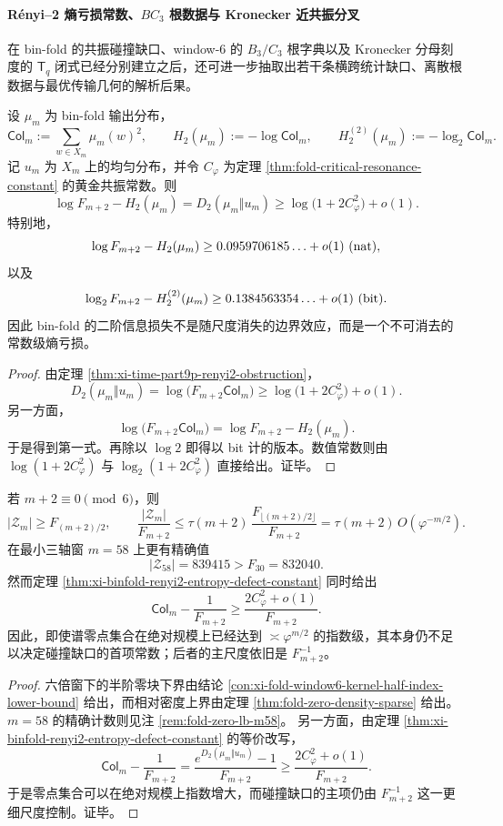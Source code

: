 \paragraph{Rényi--2 熵亏损常数、\texorpdfstring{$BC_3$}{BC3} 根数据与 Kronecker 近共振分叉}
在 bin-fold 的共振碰撞缺口、window-\(6\) 的 \(B_3/C_3\) 根字典以及 Kronecker 分母刻度的 \(\mathsf{T}_q\) 闭式已经分别建立之后，还可进一步抽取出若干条横跨统计缺口、离散根数据与最优传输几何的解析后果。

\begin{theorem}\label{thm:xi-binfold-renyi2-entropy-defect-constant}
设 \(\mu_m\) 为 bin-fold 输出分布，
\[
\mathsf{Col}_m:=\sum_{w\in X_m}\mu_m(w)^2,
\qquad
H_2(\mu_m):=-\log \mathsf{Col}_m,
\qquad
H_2^{(2)}(\mu_m):=-\log_2 \mathsf{Col}_m.
\]
记 \(u_m\) 为 \(X_m\) 上的均匀分布，并令 \(C_\varphi\) 为定理 \ref{thm:fold-critical-resonance-constant} 的黄金共振常数。则
\[
\log F_{m+2}-H_2(\mu_m)
=
D_2(\mu_m\Vert u_m)
\ge
\log\!\bigl(1+2C_\varphi^2\bigr)+o(1).
\]
特别地，
\[
\log F_{m+2}-H_2(\mu_m)\ge 0.0959706185\ldots+o(1)\ \text{\rm(nat)},
\]
以及
\[
\log_2 F_{m+2}-H_2^{(2)}(\mu_m)\ge 0.1384563354\ldots+o(1)\ \text{\rm(bit)}.
\]
因此 bin-fold 的二阶信息损失不是随尺度消失的边界效应，而是一个不可消去的常数级熵亏损。
\end{theorem}
\begin{proof}
由定理 \ref{thm:xi-time-part9p-renyi2-obstruction}，
\[
D_2(\mu_m\Vert u_m)=\log\!\bigl(F_{m+2}\mathsf{Col}_m\bigr)
\ge
\log\!\bigl(1+2C_\varphi^2\bigr)+o(1).
\]
另一方面，
\[
\log\!\bigl(F_{m+2}\mathsf{Col}_m\bigr)
=
\log F_{m+2}-H_2(\mu_m).
\]
于是得到第一式。再除以 \(\log 2\) 即得以 bit 计的版本。数值常数则由
\(\log(1+2C_\varphi^2)\) 与 \(\log_2(1+2C_\varphi^2)\) 直接给出。证毕。
\end{proof}

\begin{corollary}[谱零点绝对规模与碰撞缺口主尺度的解耦]\label{cor:xi-binfold-zero-block-collision-gap-decoupling}
若 \(m+2\equiv 0\pmod 6\)，则
\[
|\mathcal Z_m|\ge F_{(m+2)/2},
\qquad
\frac{|\mathcal Z_m|}{F_{m+2}}
\le
\tau(m+2)\,\frac{F_{\lfloor (m+2)/2\rfloor}}{F_{m+2}}
=
\tau(m+2)\,O(\varphi^{-m/2}).
\]
在最小三轴窗 \(m=58\) 上更有精确值
\[
|\mathcal Z_{58}|=839415>F_{30}=832040.
\]
然而定理 \ref{thm:xi-binfold-renyi2-entropy-defect-constant} 同时给出
\[
\mathsf{Col}_m-\frac{1}{F_{m+2}}
\ge
\frac{2C_\varphi^2+o(1)}{F_{m+2}}.
\]
因此，即使谱零点集合在绝对规模上已经达到 \(\asymp \varphi^{m/2}\) 的指数级，其本身仍不足以决定碰撞缺口的首项常数；后者的主尺度依旧是 \(F_{m+2}^{-1}\)。
\end{corollary}
\begin{proof}
六倍窗下的半阶零块下界由结论 \ref{con:xi-fold-window6-kernel-half-index-lower-bound} 给出，而相对密度上界由定理 \ref{thm:fold-zero-density-sparse} 给出。\(m=58\) 的精确计数则见注 \ref{rem:fold-zero-lb-m58}。
另一方面，由定理 \ref{thm:xi-binfold-renyi2-entropy-defect-constant} 的等价改写，
\[
\mathsf{Col}_m-\frac{1}{F_{m+2}}
=
\frac{e^{D_2(\mu_m\Vert u_m)}-1}{F_{m+2}}
\ge
\frac{2C_\varphi^2+o(1)}{F_{m+2}}.
\]
于是零点集合可以在绝对规模上指数增大，而碰撞缺口的主项仍由 \(F_{m+2}^{-1}\) 这一更细尺度控制。证毕。
\end{proof}


